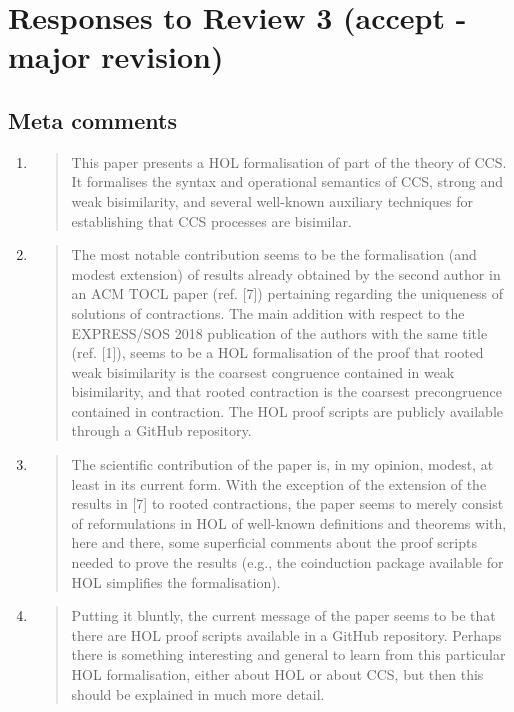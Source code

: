 \section*{Responses to Review 3 (accept - major revision)}

\subsection*{Meta comments}

\begin{enumerate}
\item \begin{quote}
    This paper presents a HOL formalisation of part of the theory of
    CCS. It formalises the syntax and operational semantics of CCS,
    strong and weak bisimilarity, and several well-known auxiliary
    techniques for establishing that CCS processes are bisimilar.
  \end{quote}

\item \begin{quote}
    The most notable contribution seems to be the formalisation (and
    modest extension) of results already obtained by the second author
    in an ACM TOCL paper (ref. [7]) pertaining regarding the
    uniqueness of solutions of contractions. The main addition with
    respect to the EXPRESS/SOS 2018 publication of the authors with
    the same title (ref. [1]), seems to be a HOL formalisation of the
    proof that rooted weak bisimilarity is the coarsest congruence
    contained in weak bisimilarity, and that rooted contraction is the
    coarsest precongruence contained in contraction. The HOL proof
    scripts are publicly available through a GitHub repository.
  \end{quote}

\item \begin{quote}
    The scientific contribution of the paper is, in my opinion,
    modest, at least in its current form. With the exception of the
    extension of the results in [7] to rooted contractions, the paper
    seems to merely consist of reformulations in HOL of well-known
    definitions and theorems with, here and there, some superficial
    comments about the proof scripts needed to prove the results
    (e.g., the coinduction package available for HOL simplifies the
    formalisation).
  \end{quote}

\item \begin{quote}
    Putting it bluntly, the current message of the paper seems to be
    that there are HOL proof scripts available in a GitHub
    repository. Perhaps there is something interesting and general to
    learn from this particular HOL formalisation, either about HOL or
    about CCS, but then this should be explained in much more detail.
  \end{quote}


\end{enumerate}
